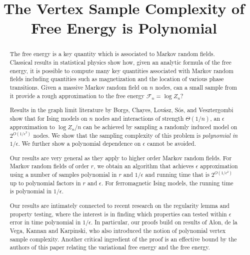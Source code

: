 \documentclass[final, 12pt]{colt2018}
\title{The Vertex Sample Complexity of Free Energy is Polynomial}
\newcommand{\F}{\mathcal{F}}
\theoremstyle{definition}
\theoremstyle{plain}
\begin{document}
\maketitle

\begin{abstract}
The free energy is a key quantity which is associated to Markov random fields.
Classical results in statistical physics show how, given an analytic formula of the free energy, it is possible to compute many key quantities associated with Markov random fields including quantities such as magnetization and the location of various phase transitions. 
Given a massive Markov random field on $n$ nodes, can a small sample from it provide a rough approximation to the free energy $\F_n = \log{Z_n}$? 

Results in the graph limit literature by Borgs, Chayes, Lov{\'a}sz, S{\'o}s, and Vesztergombi show that 
for Ising models on $n$ nodes and interactions of strength $\Theta(1/n)$, an $\epsilon$ approximation to $\log Z_n / n$ can be achieved by sampling a randomly induced model on $2^{O(1/\epsilon^2)}$ nodes. We show that the sampling complexity of this problem is {\em polynomial in }$1/\epsilon$. We further show a polynomial dependence on $\epsilon$ cannot be avoided. 

Our results are very general as they apply to higher order Markov random fields. For Markov random fields of order $r$, we obtain an algorithm that achieves $\epsilon$ approximation using a number of samples polynomial in $r$ and $1/\epsilon$ and running time that is $2^{O(1/\epsilon^2)}$ up to polynomial factors in $r$ and $\epsilon$. For ferromagnetic Ising models, the running time is polynomial in $1/\epsilon$. 

Our results are intimately connected to recent research on the regularity lemma and property testing, where the interest is in finding which properties can tested within $\epsilon$ error in time polynomial in $1/\epsilon$. In particular, our proofs build on results of Alon, de la Vega, Kannan and Karpinski, who also introduced the notion of polynomial vertex sample complexity. Another critical ingredient of the proof is an effective bound by the authors of this paper relating the variational free energy and the free energy. \end{abstract}

\end{document}
